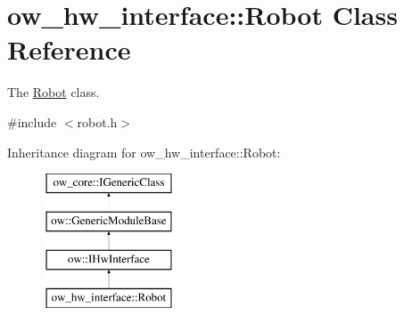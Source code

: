 \hypertarget{classow__hw__interface_1_1Robot}{}\section{ow\+\_\+hw\+\_\+interface\+:\+:Robot Class Reference}
\label{classow__hw__interface_1_1Robot}


The \hyperlink{classow__hw__interface_1_1Robot}{Robot} class.  




{\ttfamily \#include $<$robot.\+h$>$}

Inheritance diagram for ow\+\_\+hw\+\_\+interface\+:\+:Robot\+:\begin{figure}[H]
\begin{center}
\leavevmode
\includegraphics[height=4.000000cm]{d3/d22/classow__hw__interface_1_1Robot}
\end{center}
\end{figure}

